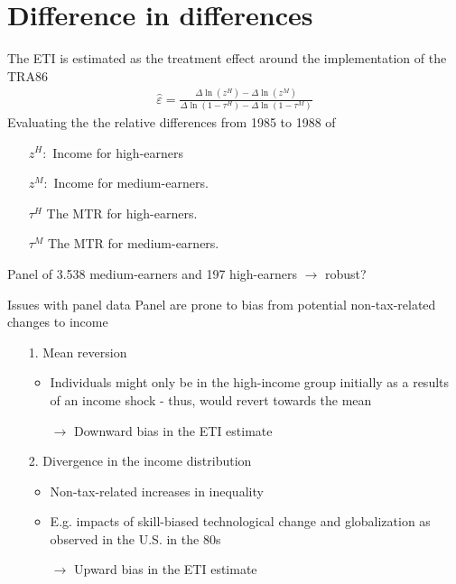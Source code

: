 \documentclass[8pt]{beamer}
\begin{document}
\section{Difference in differences}


\begin{frame}{\citet{feldstein1995effect}}
  The ETI is estimated as the treatment effect around the implementation of the TRA86
    \begin{align}
      \hat{\varepsilon}=\frac{\Delta \ln(z^H) - \Delta \ln(z^M)}{\Delta \ln(1-\tau^H) - \Delta \ln(1-\tau^M)}
      \label{eq:DD}
    \end{align}
  Evaluating the the relative differences from 1985 to 1988 of
  \begin{itemize}
    \item[$z^H:$] Income for high-earners
    \item[$z^M:$] Income for medium-earners.
    \item[$\tau^H$] The MTR for high-earners.
    \item[$\tau^M$] The MTR for medium-earners.
  \end{itemize}
  Panel of 3.538 medium-earners and 197 high-earners $\rightarrow$ robust?
\end{frame}

\begin{frame}{Issues with panel data}
  Panel are prone to bias from potential non-tax-related changes to income
  \begin{itemize}
    \item[1.] Mean reversion
    \begin{itemize}
      \item Individuals might only be in the high-income group initially as a results of an income shock - thus, would revert towards the mean
      \item[$\rightarrow$] Downward bias in the ETI estimate
    \end{itemize}
    \item[2.] Divergence in the income distribution
    \begin{itemize}
      \item Non-tax-related increases in inequality
      \item E.g. impacts of skill-biased technological change and globalization as observed in the U.S. in the 80s \citep{gruber2002elasticity}
      \item[$\rightarrow$] Upward bias in the ETI estimate
    \end{itemize}
  \end{itemize}
\end{frame}
\end{document}
